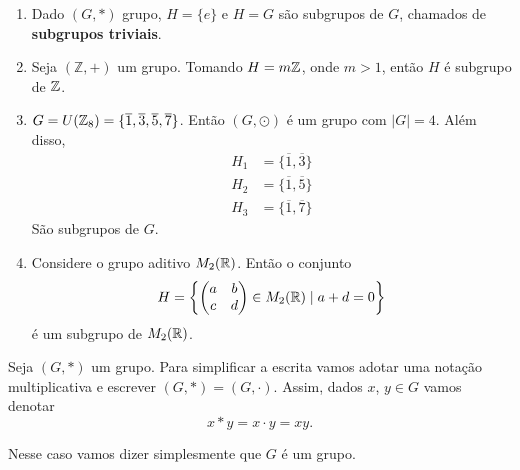 \begin{exemplos}
	\begin{enumerate}[label={\arabic*})]
		\item Dado $(G,*)$ grupo, $H=\{e\}$ e $H=G$ s{\~a}o subgrupos de $G$, chamados de \textbf{subgrupos triviais}.
		
		\item Seja $(\mathbb{Z},+)$ um grupo. Tomando $H = m\mathbb{Z}$, onde $m > 1$, ent{\~a}o $H$ {\'e} subgrupo de $\mathbb{Z}$.
		
		\item $G = U(\mathbb{Z}_8) = \{\overline{1}, \overline{3}, \overline{5}, \overline{7}\}$. Ent\~ao $(G,\odot)$ {\'e} um grupo com $|G| = 4$. Al\'em disso,
		\begin{align*}
			H_1 &= \{\overline{1}, \overline{3}\}\\
			H_2 &= \{\overline{1}, \overline{5}\}\\
			H_3 &= \{\overline{1}, \overline{7}\}
		\end{align*}
		S\~ao subgrupos de $G$.

		\item Considere o grupo aditivo $M_2(\mathbb{R})$. Ent\~ao o conjunto
        \[
            H = \left\{\begin{pmatrix}
                a & b\\c & d
            \end{pmatrix} \in M_2(\mathbb{R}) \mid a + d = 0\right\} 
        \]
        \'e um subgrupo de $M_2(\mathbb{R})$.
	\end{enumerate}
\end{exemplos}

Seja $(G, *)$ um grupo. Para simplificar a escrita vamos adotar uma nota\c{c}\~ao multiplicativa e escrever $(G, *) = (G, \cdot)$. Assim, dados $x$, $y \in G$ vamos denotar
\[
    x * y = x \cdot y = xy.
\]

Nesse caso vamos dizer simplesmente que $G$ \'e um grupo.

